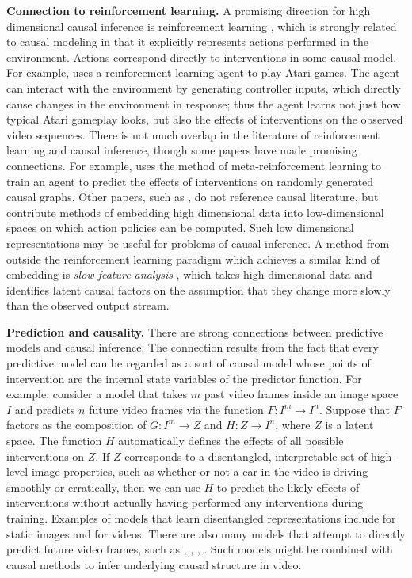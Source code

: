 \documentclass[letterpaper]{article} %
\begin{document}
\noindent \textbf{Connection to reinforcement learning.} A promising direction for high dimensional causal inference is reinforcement learning \cite{sutton2018reinforcement}, which is strongly related to causal modeling in that it explicitly represents actions performed in the environment. Actions correspond directly to interventions in some causal model. For example, \cite{oh2015action} uses a reinforcement learning agent to play Atari games. The agent can interact with the environment by generating controller inputs, which directly cause changes in the environment in response; thus the agent learns not just how typical Atari gameplay looks, but also the effects of interventions on the observed video sequences. There is not much overlap in the literature of reinforcement learning and causal inference, though some papers have made promising connections. For example, \cite{dasgupta2019causal} uses the method of meta-reinforcement learning to train an agent to predict the effects of interventions on randomly generated causal graphs. Other papers, such as \cite{lange2012autonomous}, do not reference causal literature, but contribute methods of embedding high dimensional data into low-dimensional spaces on which action policies can be computed. Such low dimensional representations may be useful for problems of causal inference. A method from outside the reinforcement learning paradigm which achieves a similar kind of embedding is \emph{slow feature analysis} \cite{kompella2011incremental}, which takes high dimensional data and identifies latent causal factors on the assumption that they change more slowly than the observed output stream.

\noindent \textbf{Prediction and causality.} There are strong connections between predictive models and causal inference. The connection results from the fact that every predictive model can be regarded as a sort of causal model whose points of intervention are the internal state variables of the predictor function. For example, consider a model that takes $m$ past video frames inside an image space $I$ and predicts $n$ future video frames via the function $F: I^m \rightarrow I^n$. Suppose that $F$ factors as the composition of $G: I^m \rightarrow Z$ and $H: Z \rightarrow I^n$, where $Z$ is a latent space. The function $H$ automatically defines the effects of all possible interventions on $Z$. If $Z$ corresponds to a disentangled, interpretable set of high-level image properties, such as whether or not a car in the video is driving smoothly or erratically, then we can use $H$ to predict the likely effects of interventions without actually having performed any interventions during training. Examples of models that learn disentangled representations include \cite{chen2016infogan} for static images and \cite{denton2017unsupervised} for videos. There are also many models that attempt to directly predict future video frames, such as \cite{babaeizadeh2017stochastic}, \cite{lotter2016deep}, \cite{finn2016unsupervised}, \cite{walker2014patch}. Such models might be combined with causal methods to infer underlying causal structure in video.
\end{document}
